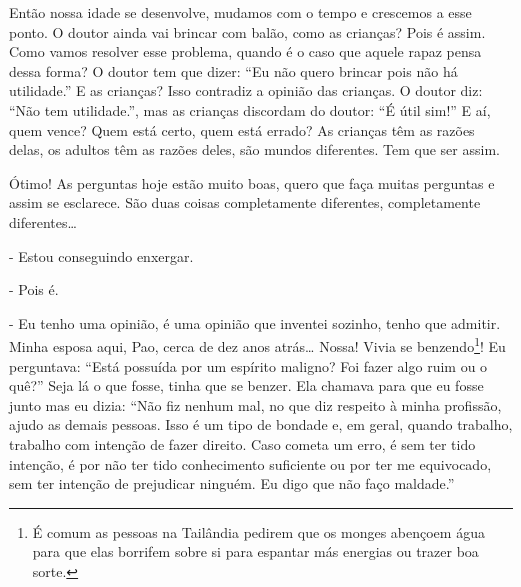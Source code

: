 Então nossa idade se desenvolve, mudamos com o tempo e crescemos a
esse ponto. O doutor ainda vai brincar com balão, como as crianças?
Pois é assim. Como vamos resolver esse problema, quando é o caso que
aquele rapaz pensa dessa forma? O doutor tem que dizer: “Eu não quero
brincar pois não há utilidade.” E as crianças? Isso contradiz a opinião
das crianças. O doutor diz: “Não tem utilidade.”, mas as crianças
discordam do doutor: “É útil sim!” E aí, quem vence? Quem está certo,
quem está errado? As crianças têm as razões delas, os adultos têm as
razões deles, são mundos diferentes. Tem que ser assim. 

Ótimo! As perguntas hoje estão muito boas, quero que faça muitas
perguntas e assim se esclarece. São duas coisas completamente
diferentes, completamente diferentes…

- Estou conseguindo enxergar.

- Pois é. 

- Eu tenho uma opinião, é uma opinião que inventei sozinho, tenho
que admitir. Minha esposa aqui, Pao, cerca de dez anos atrás… Nossa!
Vivia se benzendo\footnote{É comum as pessoas na Tailândia pedirem que
os monges abençoem água para que elas borrifem sobre si para espantar
más energias ou trazer boa sorte.}! Eu perguntava: “Está possuída por
um espírito maligno? Foi fazer algo ruim ou o quê?” Seja lá o que
fosse, tinha que se benzer. Ela chamava para que eu fosse junto mas eu
dizia: “Não fiz nenhum mal, no que diz respeito à minha profissão,
ajudo as demais pessoas. Isso é um tipo de bondade e, em geral, quando
trabalho, trabalho com intenção de fazer direito. Caso cometa um erro,
é sem ter tido intenção, é por não ter tido conhecimento suficiente ou
por ter me equivocado, sem ter intenção de prejudicar ninguém. Eu digo
que não faço maldade.”

